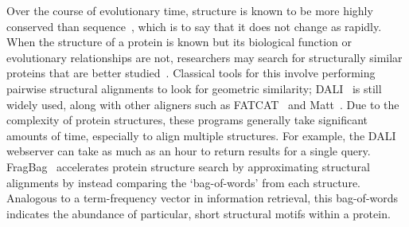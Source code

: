 \documentclass[12pt]{article}
\begin{document}
Over the course of evolutionary time, structure is known to be more highly 
conserved than sequence~\cite{illergaard2009structure}, which is to say that it 
does not change as rapidly.
When the structure of a protein is known but its biological function or 
evolutionary relationships are not, researchers may search for structurally
similar proteins that are better studied~\cite{gibrat1996surprising}.
Classical tools for this involve performing pairwise structural alignments to
look for geometric similarity; DALI~\cite{holm1995dali} is still widely used,
along with other aligners such as FATCAT~\cite{ye2004fatcat} and 
Matt~\cite{menke2008matt}.
Due to the complexity of protein structures, these programs generally take 
significant amounts of time,
especially to align multiple structures.
For example, the DALI webserver can take as much as an hour to return results
for a single query.
FragBag~\cite{budowski2010fragbag} accelerates protein structure search by
approximating structural alignments
by instead comparing the `bag-of-words' from each structure.
Analogous to a term-frequency vector in information retrieval, this bag-of-words
indicates the abundance of particular, short structural motifs within a protein.



        


\end{document}
